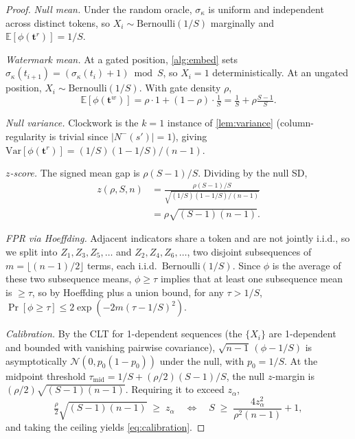 \begin{proof}
  \emph{Null mean.}  Under the random oracle, $\sigma_\kappa$ is uniform
  and independent across distinct tokens, so $X_i \sim
  \mathrm{Bernoulli}(1/S)$ marginally and
  $\mathbb{E}[\phi(\mathbf{t}^r)] = 1/S$.

  \emph{Watermark mean.}  At a gated position,
  \autoref{alg:embed} sets $\sigma_\kappa(t_{i+1}) = (\sigma_\kappa(t_i) + 1)
  \bmod S$, so $X_i = 1$ deterministically.  At an ungated position,
  $X_i \sim \mathrm{Bernoulli}(1/S)$.  With gate density $\rho$,
  \[
    \mathbb{E}[\phi(\mathbf{t}^w)]
      = \rho \cdot 1 + (1-\rho) \cdot \tfrac{1}{S}
      = \tfrac{1}{S} + \rho \tfrac{S-1}{S}.
  \]

  \emph{Null variance.}  Clockwork is the $k=1$ instance of
  \autoref{lem:variance} (column-regularity is trivial since
  $|N^-(s')| = 1$), giving
  $\mathrm{Var}[\phi(\mathbf{t}^r)] = (1/S)(1-1/S)/(n-1)$.

  \emph{$z$-score.}  The signed mean gap is $\rho(S-1)/S$.  Dividing
  by the null SD,
  \begin{align*}
    z(\rho,S,n)
      &= \frac{\rho(S-1)/S}{\sqrt{(1/S)(1-1/S)/(n-1)}} \\
      &= \rho \sqrt{(S-1)(n-1)}.
  \end{align*}

  \emph{FPR via Hoeffding.}  Adjacent indicators share a token and
  are not jointly i.i.d., so we split into $Z_1, Z_3, Z_5, \dots$ and
  $Z_2, Z_4, Z_6, \dots$, two disjoint subsequences of $m =
  \lfloor (n-1)/2 \rfloor$ terms, each i.i.d.\
  $\mathrm{Bernoulli}(1/S)$. Since $\phi$ is the average of these
  two subsequence means, $\phi \geq \tau$ implies that at least one
  subsequence mean is $\geq \tau$, so by Hoeffding plus a union
  bound, for any $\tau > 1/S$,
  \(
    \Pr[\phi \geq \tau] \leq 2 \exp(-2 m (\tau - 1/S)^2).
  \)


  \emph{Calibration.}  By the CLT for 1-dependent sequences (the
  $\{X_i\}$ are 1-dependent and bounded with vanishing pairwise
  covariance), $\sqrt{n-1}\,(\phi - 1/S)$ is asymptotically
  $\mathcal{N}(0, p_0(1-p_0))$ under the null, with $p_0 = 1/S$.  At
  the midpoint threshold $\tau_{\mathrm{mid}} = 1/S +
  (\rho/2)(S-1)/S$, the null $z$-margin is
  $(\rho/2) \sqrt{(S-1)(n-1)}$.  Requiring it to exceed $z_\alpha$,
  \[
    \tfrac{\rho}{2} \sqrt{(S-1)(n-1)} \;\geq\; z_\alpha
    \quad\Longleftrightarrow\quad
    S \;\geq\; \frac{4 z_\alpha^2}{\rho^2 (n-1)} + 1,
  \]
  and taking the ceiling yields \eqref{eq:calibration}.
\end{proof}

